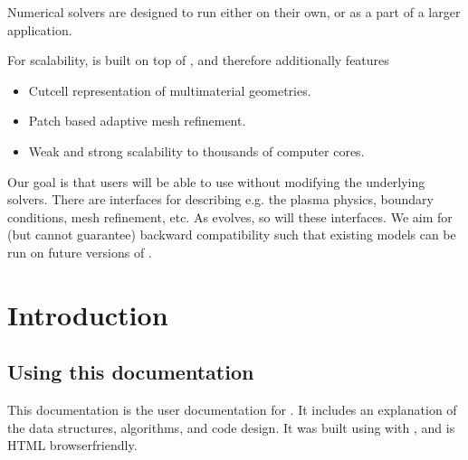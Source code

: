 \documentclass[letterpaper,10pt,english]{sphinxmanual}
\begin{document}
Numerical solvers are designed to run either on their own, or as a part of a larger application.

For scalability,  is built on top of , and therefore additionally features
\begin{itemize}
\item {} 
Cut\sphinxhyphen{}cell representation of multi\sphinxhyphen{}material geometries.

\item {} 
Patch based adaptive mesh refinement.

\item {} 
Weak and strong scalability to thousands of computer cores.

\end{itemize}

Our goal is that users will be able to use  without modifying the underlying solvers.
There are interfaces for describing e.g. the plasma physics, boundary conditions, mesh refinement, etc.
As  evolves, so will these interfaces.
We aim for (but cannot guarantee) backward compatibility such that existing  models can be run on future versions of .




\chapter{Introduction}
\label{\detokenize{index:introduction}}

\section{Using this documentation}
\label{\detokenize{Base/Documentation:using-this-documentation}}\label{\detokenize{Base/Documentation::doc}}
This documentation is the user documentation for .
It includes an explanation of the data structures, algorithms, and code design.
It was built using  with , and is HTML browser\sphinxhyphen{}friendly.
\end{document}
